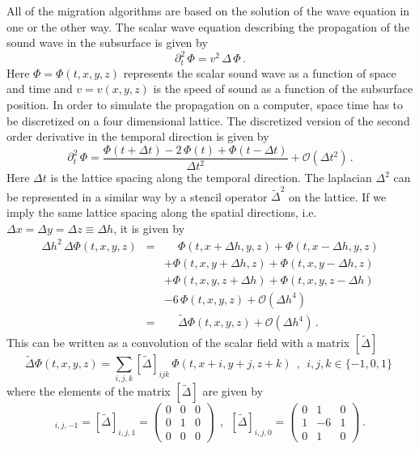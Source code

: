 \documentclass[12pt,a4paper]{article}
\begin{document}
All of the migration algorithms are based  
on the solution of the wave equation in one or the other way.  
The scalar wave equation describing the propagation of the 
sound wave in the subsurface is given by
\begin{equation}
\partial_t^2 \, \Phi = v^2\,\Delta\,\Phi\,.
\end{equation}
Here $\Phi=\Phi(t,x,y,z)$ represents the scalar sound wave as a function of space and time and
$v=v(x,y,z)$ is the speed of sound as a function of the subsurface position. In order to simulate
the propagation on a computer, space time has to be discretized on a four dimensional lattice. 
The discretized version of the second order derivative in the 
temporal direction is given by 
\begin{equation}
\partial_t^2\,\Phi = \frac{\Phi(t+\Delta t)-2\,\Phi(t)+\Phi(t-\Delta t)}{\Delta t^2} + \mathcal{O}(\Delta t^2)\,.
\end{equation}
Here $\Delta t$ is the lattice spacing along the temporal direction.
The laplacian $\Delta^2$ can be represented in a similar way by a stencil 
operator $\tilde{\Delta}^2$ on the lattice. 
If we imply the same lattice spacing along the spatial directions, i.e. $\Delta x = \Delta y = \Delta z \equiv \Delta h$, it is given by
\begin{eqnarray}
\Delta h^2\,\Delta \Phi(t,x,y,z)& = & \phantom{+} \Phi(t,x+\Delta h,y,z) + \Phi(t,x-\Delta h,y,z) \nonumber\\
				&   & + \Phi(t,x,y+\Delta h,z) + \Phi(t,x,y-\Delta h,z) \nonumber\\
				&   & + \Phi(t,x,y,z+\Delta h) + \Phi(t,x,y,z-\Delta h) \nonumber\\
				&   & - 6\,\Phi(t,x,y,z)+\mathcal{O}(\Delta h^4) \nonumber\\
                                & = & \phantom{+}\tilde{\Delta} \Phi(t,x,y,z)+\mathcal{O}(\Delta h^4)\,.
\end{eqnarray}
This can be written as a convolution of the scalar field with a matrix $[\tilde{\Delta}]$
\begin{equation}
\tilde{\Delta} \Phi(t,x,y,z) = \sum_{i,j,k} [\tilde{\Delta}]_{ijk}\, \Phi(t,x+i,y+j,z+k)~~,~~i,j,k\in \{-1,0,1 \}\;
\end{equation}
where the elements of the matrix $[\tilde{\Delta}]$ are given by
\begin{equation}
[\tilde{\Delta}]_{i,j,-1}=[\tilde{\Delta}]_{i,j,1}= \left(
\begin{array}{ccc}
0 & 0 & 0 \\
0 & 1 & 0 \\
0 & 0 & 0 
\end{array}
\right) ~~,~~
[\tilde{\Delta}]_{i,j,0}= \left(
\begin{array}{ccc}
0 & 1  & 0 \\
1 & -6 & 1 \\
0 & 1  & 0 
\end{array}
\right)~.
\end{equation}
\end{document}
